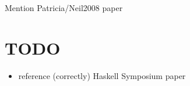 \documentclass[acmsmall,screen,review,anonymous]{acmart}
\theoremstyle{definition}
\begin{document}
Mention Patricia/Neil2008 paper



\section{TODO}

\begin{itemize}
\item reference (correctly) Haskell Symposium paper
\end{itemize}


%
%



\end{document}
